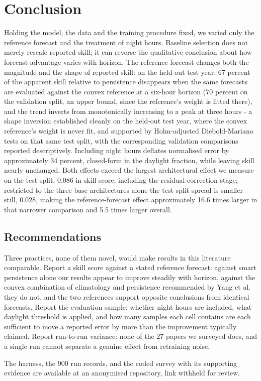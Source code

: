\section{Conclusion}
\label{sec:conclusion}

Holding the model, the data and the training procedure fixed, we
varied only the reference forecast and the treatment of night hours.
Baseline selection does not merely rescale reported skill; it can
reverse the qualitative conclusion about how forecast advantage varies
with horizon. The reference forecast changes both the magnitude and
the shape of reported skill: on the held-out test year, 67 percent of
the apparent skill relative to persistence disappears when the same
forecasts are evaluated against the convex reference at a six-hour
horizon (70 percent on the validation split, an upper bound, since the
reference's weight is fitted there), and the trend inverts from
monotonically increasing to a peak at three hours - a shape inversion
established cleanly on the held-out test year, where the convex
reference's weight is never fit, and supported by Holm-adjusted
Diebold-Mariano tests on that same test split, with the corresponding
validation comparisons reported descriptively. Including night hours
deflates normalised error by approximately 34 percent, closed-form in
the daylight fraction, while leaving skill nearly unchanged. Both
effects exceed the largest architectural effect we measure on the test
split, 0.086 in skill score, including the residual correction stage;
restricted to the three base architectures alone the test-split spread
is smaller still, 0.028, making the reference-forecast effect
approximately 16.6 times larger in that narrower comparison and 5.5
times larger overall.

\subsection{Recommendations}
\label{sec:conclusion-recommendations}

Three practices, none of them novel, would make results in this
literature comparable. Report a skill score against a stated reference
forecast: against smart persistence alone our results appear to
improve steadily with horizon, against the convex combination of
climatology and persistence recommended by Yang et
al.~\cite{yang2020verification} they do not, and the two references
support opposite conclusions from identical forecasts. Report the
evaluation sample: whether night hours are included, what daylight
threshold is applied, and how many samples each cell contains are each
sufficient to move a reported error by more than the improvement
typically claimed. Report run-to-run variance: none of the 27 papers
we surveyed does, and a single run cannot separate a genuine effect
from retraining noise.

The harness, the 900 run records, and the coded survey with its
supporting evidence are available at an anonymised repository, link
withheld for review.
